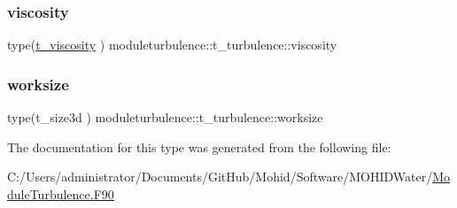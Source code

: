 \mbox{\label{structmoduleturbulence_1_1t__turbulence_a13cae45c1ff69316624fd13314164ce2}} 
\subsubsection{\texorpdfstring{viscosity}{viscosity}}
{\footnotesize\ttfamily type(\mbox{\hyperlink{structmoduleturbulence_1_1t__viscosity}{t\+\_\+viscosity}} ) moduleturbulence\+::t\+\_\+turbulence\+::viscosity\hspace{0.3cm}{\ttfamily [private]}}

\mbox{\label{structmoduleturbulence_1_1t__turbulence_aa638d6036d573efdd2c3fc405cb03665}} 
\subsubsection{\texorpdfstring{worksize}{worksize}}
{\footnotesize\ttfamily type(t\+\_\+size3d ) moduleturbulence\+::t\+\_\+turbulence\+::worksize\hspace{0.3cm}{\ttfamily [private]}}



The documentation for this type was generated from the following file\+:\begin{DoxyCompactItemize}
\item 
C\+:/\+Users/administrator/\+Documents/\+Git\+Hub/\+Mohid/\+Software/\+M\+O\+H\+I\+D\+Water/\mbox{\hyperlink{_module_turbulence_8_f90}{Module\+Turbulence.\+F90}}\end{DoxyCompactItemize}

